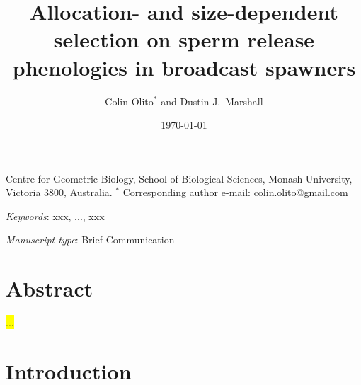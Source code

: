 \documentclass{article}
\title{Allocation- and size-dependent selection on sperm release phenologies in broadcast spawners}
\author{Colin Olito$^{\ast}$ and Dustin J.~Marshall}
\date{\today}
\begin{document}
\maketitle


\noindent{} Centre for Geometric Biology, School of Biological Sciences, Monash University, Victoria 3800, Australia.
\noindent{} $^\ast$ Corresponding author e-mail: colin.olito@gmail.com

\bigskip

\noindent{} \textit{Keywords}: xxx, ..., xxx

\bigskip

\noindent{} \textit{Manuscript type}: Brief Communication

\bigskip


\linenumbers
\modulolinenumbers[1]
\renewcommand\linenumberfont{\normalfont\small}


\newpage{}
\section*{Abstract}

\noindent{} \hl{...}

\section*{Introduction}

\end{document}
